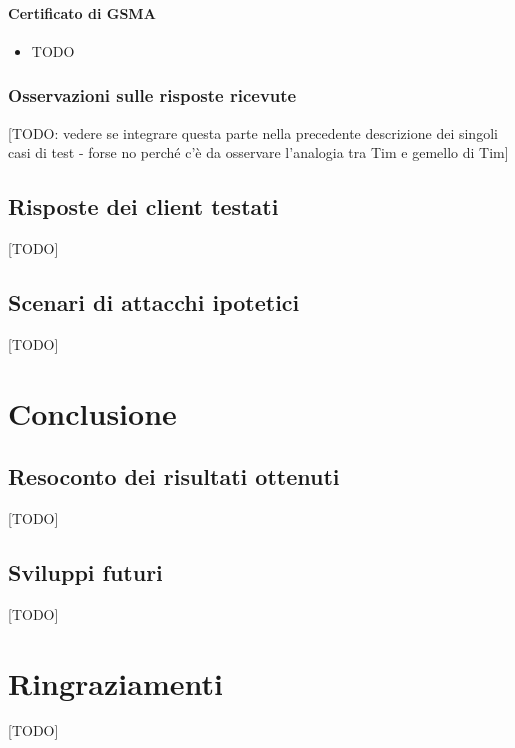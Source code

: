 \documentclass[10pt, oneside]{book}
\begin{document}
\subsubsection{Certificato di GSMA}
\begin{itemize}
\item TODO
\end{itemize}

\subsection{Osservazioni sulle risposte ricevute}
[TODO: vedere se integrare questa parte nella precedente descrizione dei singoli casi di test - forse no perché c'è da osservare l'analogia tra Tim e gemello di Tim]

\section{Risposte dei client testati}
[TODO]

\section{Scenari di attacchi ipotetici}
[TODO]

\chapter{Conclusione}
\section{Resoconto dei risultati ottenuti}
[TODO]

\section{Sviluppi futuri}
[TODO]



\chapter*{Ringraziamenti}
[TODO]
\end{document}
